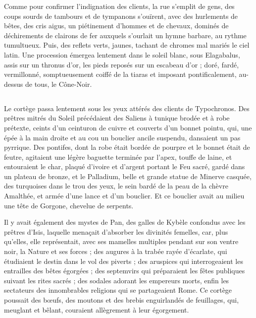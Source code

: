 \documentclass[a4paper, 11pt, oneside, polutonikogreek, french]{article}
\begin{document}
Comme pour confirmer l'indignation des clients, la rue s'emplit de gens, des coups sourds de tambours et de tympanons s'ouïrent, avec des hurlements de bêtes, des cris aigus, un piétinement d'hommes et de chevaux, dominés de déchirements de clairons de fer auxquels s'ourlait un hymne barbare, au rythme tumultueux. Puis, des reflets verts, jaunes, tachant de chromes mal mariés le ciel latin. Une procession émergea lentement dans le soleil blanc, sous Elagabalus, assis sur un thronus d'or, les pieds reposés sur un escabeau d'or ; doré, fardé, vermillonné, somptueusement coiffé de la tiaras et imposant pontificalement, au-dessus de tous, le Cône-Noir.
\clearpage
\subsection{}
\paragraph{}
Le cortège passa lentement sous les yeux attérés des clients de Typochronos. Des prêtres mitrés du Soleil précédaient des Saliens à tunique brodée et à robe prétexte, ceints d'un ceinturon de cuivre et couverts d'un bonnet pointu, qui, une épée à la main droite et au cou un bouclier ancile suspendu, dansaient un pas pyrrique. Des pontifes, dont la robe était bordée de pourpre et le bonnet était de feutre, agitaient une légère baguette terminée par l'apex, touffe de laine, et entouraient le char, plaqué d'ivoire et d'argent portant le Feu sacré, gardé dans un plateau de bronze, et le Palladium, belle et grande statue de Minerve casquée, des turquoises dans le trou des yeux, le sein bardé de la peau de la chèvre Amalthée, et armée d'une lance et d'un bouclier. Et ce bouclier avait au milieu une tête de Gorgone, chevelue de serpents.

Il y avait également des mystes de Pan, des galles de Kybèle confondus avec les prêtres d'Isis, laquelle menaçait d'absorber les divinités femelles, car, plus qu'elles, elle représentait, avec ses mamelles multiples pendant sur son ventre noir, la Nature et ses forces ; des augures à la trabée rayée d'écarlate, qui étudiaient le destin dans le vol des piverts ; des aruspices qui interrogeaient les entrailles des bêtes égorgées ; des septemvirs qui préparaient les fêtes publiques suivant les rites sacrés ; des sodales adorant les empereurs morts, enfin les sectateurs des innombrables religions qui se partageaient Rome. Ce cortège poussait des bœufs, des moutons et des brebis enguirlandés de feuillages, qui, meuglant et bêlant, couraient allègrement à leur égorgement.
\end{document}
